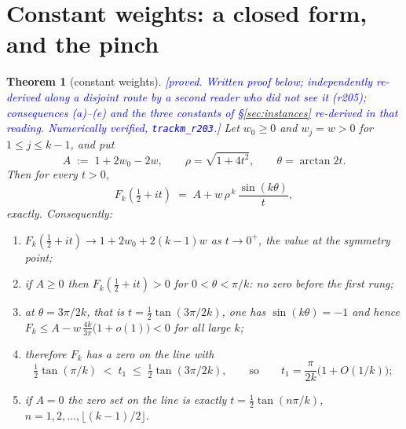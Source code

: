 \documentclass[11pt,a4paper]{article}
\theoremstyle{plain}
\newtheorem{theorem}{Theorem}[section]
\theoremstyle{definition}
\theoremstyle{remark}
\newcommand{\STATUS}[1]{\textcolor{blue}{\textsf{[#1]}}}
\begin{document}
\section{Constant weights: a closed form, and the pinch}\label{sec:const}

\begin{theorem}[constant weights]\label{thm:const}
\STATUS{proved. Written proof below; independently re-derived along a disjoint route by
a second reader who did not see it (r205); consequences \textup{(a)--(e)} and the three
constants of \S\ref{sec:instances} re-derived in that reading. Numerically verified,
\texttt{trackm\_r203}.}
Let $w_0\ge0$ and $w_j=w>0$ for $1\le j\le k-1$, and put
\[
  A\;:=\;1+2w_0-2w,\qquad \rho=\sqrt{1+4t^{2}},\qquad \theta=\arctan2t .
\]
Then for every $t>0$,
\begin{equation}\label{eq:closed}
  F_k\!\left(\tfrac12+it\right)\;=\;A+w\,\rho^{\,k}\,\frac{\sin(k\theta)}{t},
\end{equation}
exactly. Consequently:
\begin{enumerate}
\item[\textup{(a)}] $F_k(\tfrac12+it)\to1+2w_0+2(k-1)w$ as $t\to0^{+}$, the value at the
      symmetry point;
\item[\textup{(b)}] if $A\ge0$ then $F_k(\tfrac12+it)>0$ for $0<\theta<\pi/k$: no zero
      before the first rung;
\item[\textup{(c)}] at $\theta=3\pi/2k$, that is $t=\tfrac12\tan(3\pi/2k)$, one has
      $\sin(k\theta)=-1$ and hence
      $F_k\le A-w\,\tfrac{4k}{3\pi}\bigl(1+o(1)\bigr)<0$ for all large $k$;
\item[\textup{(d)}] therefore $F_k$ has a zero on the line with
      \[
        \tfrac12\tan(\pi/k)\;<\;t_1\;\le\;\tfrac12\tan(3\pi/2k),
        \qquad\text{so}\qquad t_1=\frac{\pi}{2k}\bigl(1+O(1/k)\bigr);
      \]
\item[\textup{(e)}] if $A=0$ the zero set on the line is \emph{exactly}
      $t=\tfrac12\tan(n\pi/k)$, $n=1,2,\dots,\lfloor(k-1)/2\rfloor$.
\end{enumerate}
\end{theorem}
\end{document}
